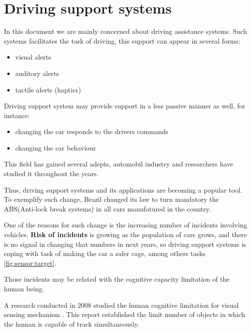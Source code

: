 \section{Driving support systems}

In this document we are mainly concerned about driving assistance systems. Such systems facilitates the task of driving, this support can appear in several forms: 

\begin{itemize}
\item visual alerts
\item auditory alerts
\item tactile alerts (haptics\cite{riener2010sensor})
\end{itemize}

Driving support system may provide support in a less passive manner as well, for instance:

\begin{itemize}
\item changing the car responds to the drivers commands
\item changing the car behaviour
\end{itemize}

This field has gained several adepts, automobil industry and researchers have studied it throughout the years.

Thus, driving support systems and its applications are becoming a popular tool. To exemplify such change, Brazil changed its law to turn mandatory the ABS(Anti-lock break systems) in all cars manufatured in the country.

One of the reasons for such change is the increasing number of incidents involving vehicles. \textbf{Risk of incidents} is growing as the population of cars grows, and there is no signal in changing that numbers in next years, so driving support systems is coping with task of making the car a safer cage, among others tasks \ref{fig:sensor:target}.

Those incidents may be related with the cognitive capacity limitation of the human being. 


A research conducted in 2008 studied the human cognitive limitation for visual sensing mechanism \cite{LautarutisV}. This report established the limit number of objects in which the human is capable of track simultaneously. 


